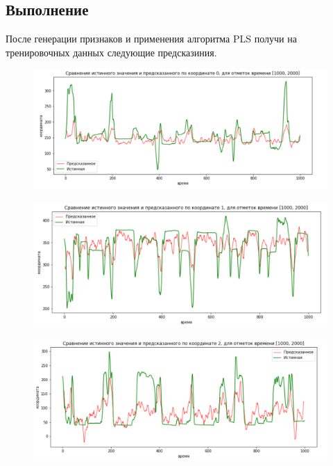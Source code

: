 \documentclass{article}
\begin{document}
\subsection{Выполнение}
После генерации признаков и применения алгоритма PLS получи на тренировочных данных следующие предсказиния.

\begin{figure}[H]
\includegraphics[scale=0.34]{images/1.png}
\end{figure}
\begin{figure}[H]
\includegraphics[scale=0.34]{images/2.png}
\end{figure}
\begin{figure}[H]
\includegraphics[scale=0.34]{images/3.png}
\end{figure}
\end{document}
